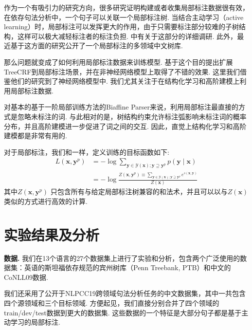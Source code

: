 作为一个有吸引力的研究方向，很多研究证明构建或者收集局部标注数据很有效\cite{nivre-etal-2014-squibs,hwa-99-partial-annotation,pereira-92-inside-outside}，在依存句法分析中，一个句子可以关联一个局部标注树.
当结合主动学习（active learning）时，局部标注可以发挥更大的作用，由于只需要标注部分较难的子树结构，这样可以极大减轻标注者的标注负担.
\cite{li-etal-2016-active}中有关于这部分的详细调研.
此外，\cite{peng2019overview}最近基于这方面的研究公开了一个局部标注的多领域中文树库.

那么问题就变成了如何利用局部标注数据来训练模型.
\cite{li-etal-2016-active}基于这个目的提出扩展TreeCRF到局部标注场景，并在非神经网络模型上取得了不错的效果.
这里我们借鉴他们的研究到了神经网络模型中.
我们尤其关注于在结构化学习和高阶建模上利用局部标注数据.

对基本的基于一阶局部训练方法的Biaffine Parser来说，利用局部标注最直接的方式是忽略未标注的词.
与此相对的是，树结构约束允许标注弧影响未标注词的概率分布，并且高阶建模进一步促进了词之间的交互.
因此，直觉上结构化学习和高阶建模都是非常有用的.

对于局部标注，我们和\cite{li-etal-2016-active}一样，定义训练的目标函数如下:
\begin{equation}
    \label{eq:training-loss-treecrf-partial}
    \begin{split}
        \mathit{L}(\boldsymbol{x}, {\boldsymbol{y}^p}) &= -\log \sum\limits_{\boldsymbol{y} \in \mathcal{Y}(\boldsymbol{x}); \boldsymbol{y} \supseteq {\boldsymbol{y}^p}} p(\boldsymbol{y}\mid\boldsymbol{x})  \\
        &= - \log \frac{Z(\boldsymbol{x}, {\boldsymbol{y}^p}) \equiv \sum\limits_{\boldsymbol{y} \in \mathcal{Y}(\boldsymbol{x}); \boldsymbol{y} \supseteq \boldsymbol{y}^p} e^{s(\boldsymbol{x},\boldsymbol{y})}}{Z(\boldsymbol{x})}
    \end{split}
\end{equation}
其中$Z(\boldsymbol{x}, {\boldsymbol{y}^p})$ 只包含所有与给定局部标注树兼容的和法术，并且可以以与$Z(\boldsymbol{x})$类似的方式进行高效的计算.

\section{实验结果及分析}
\noindent\textbf{数据.}
我们在13个语言的27个数据集上进行了实验和分析，包含两个广泛使用的数据集：英语的斯坦福依存规范\cite{chen-manning-2014-fast}的宾州树库（Penn Treebank, PTB）和中文的CoNLL09数据\cite{hajic-etal-2009-conll}.

我们还采用了公开于NLPCC19跨领域句法分析任务的中文数据集\cite{peng2019overview}，其中一共包含四个源领域和三个目标领域.
方便起见，我们直接分别合并了四个领域的train/dev/test数据到更大的数据集.
这些数据的一个特征是大部分句子都是基于主动学习的局部标注.

